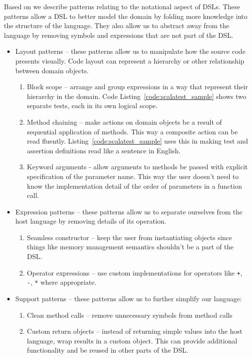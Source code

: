 Based on \autocite{Gunther:2011} we describe patterns relating to the notational aspect of DSLs.
These patterns allow a DSL to better model the domain by folding more knowledge into the structure of the language.
They also allow us to abstract away from the language by removing symbols and expressions that are not part of the DSL.

\begin{itemize}
	\item Layout patterns -- these patterns allow us to manipulate how the source code presents visually.
Code layout can represent a hierarchy or other relationship between domain objects.
	\begin{enumerate}
		\item Block scope -- arrange and group expressions in a way that represent their hierarchy in the domain.
Code Listing~\ref{code:scalatest_sample} shows two separate tests, each in its own logical scope.
		\item Method chaining -- make actions on domain objects be a result of sequential application of methods.
This way a composite action can be read fluently.
Listing~\ref{code:scalatest_sample} uses this in making test and assertion definitions read like a sentence in English.
		\item Keyword arguments - allow arguments to methods be passed with explicit specification of the parameter name.
This way the user doesn't need to know the implementation detail of the order of parameters in a function call.
	\end{enumerate}
	\item Expression patterns -- these patterns allow us to separate ourselves from the host language by removing details of its operation.
	\begin{enumerate}
		\item Seamless constructor -- keep the user from instantiating objects since things like memory management semantics shouldn't be a part of the DSL.
		\item Operator expressions -- use custom implementations for operators like \texttt{+}, \texttt{-}, \texttt{*} where appropriate.
	\end{enumerate}
	\item Support patterns -- these patterns allow us to further simplify our language:
	\begin{enumerate}
		\item Clean method calls -- remove unnecessary symbols from method calls
		\item Custom return objects -- instead of returning simple values into the host language, wrap results in a custom object.
This can provide additional functionality and be reused in other parts of the DSL.
	\end{enumerate}
\end{itemize}

